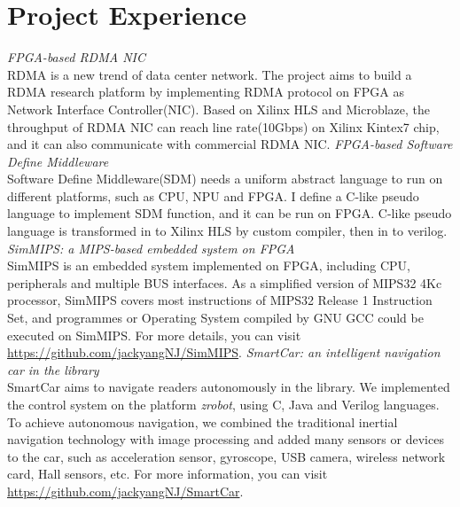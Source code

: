 \documentclass[11pt,a4paper]{moderncv}
\begin{document}
\section{Project Experience}
{
	\smallskip
	\emph{FPGA-based RDMA NIC}
	\medskip \\
	RDMA is a new trend of data center network. The project aims to build a RDMA research platform by implementing RDMA protocol on FPGA as Network Interface Controller(NIC). Based on Xilinx HLS and Microblaze, the throughput of RDMA NIC can reach line rate(10Gbps) on Xilinx Kintex7 chip, and it can also communicate with commercial RDMA NIC.\newline
}
{
   \smallskip
	\emph{FPGA-based Software Define Middleware}
	\medskip \\
	Software Define Middleware(SDM) needs a uniform abstract language to run on different platforms, such as CPU, NPU and FPGA. I define a C-like pseudo language to implement SDM function, and it can be run on FPGA. C-like pseudo language is transformed in to Xilinx HLS by custom compiler, then in to verilog. 
}
{
    \smallskip
    \emph{SimMIPS: a MIPS-based embedded system on FPGA}
    \medskip \\
    SimMIPS is an embedded system implemented on FPGA, including CPU, peripherals and multiple BUS interfaces. As a simplified version of MIPS32 4Kc processor, SimMIPS covers most instructions of MIPS32 Release 1 Instruction Set, and programmes or Operating System compiled by GNU GCC could be executed on SimMIPS. For more details, you can visit \url{https://github.com/jackyangNJ/SimMIPS}.\newline
}
{
    \smallskip
    \emph{SmartCar: an intelligent navigation car in the library}
    \medskip  \\
    SmartCar aims to navigate readers autonomously in the library.
    We implemented the control system on the platform {\emph{zrobot}}, using C, Java and Verilog languages. To achieve autonomous navigation, we combined the traditional inertial navigation technology with image processing and added many sensors or devices to the car, such as acceleration sensor, gyroscope, USB camera, wireless network card, Hall sensors, etc. For more information, you can visit \url{https://github.com/jackyangNJ/SmartCar}.\newline
}
\end{document}
